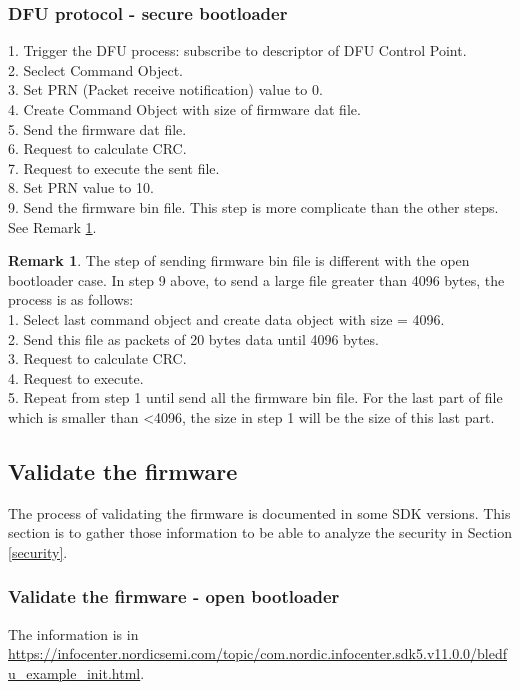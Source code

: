 \documentclass{article}
\theoremstyle{plain}
\theoremstyle{definition}
\newtheorem{remark}{Remark}
\numberwithin{equation}{section}
\begin{document}
\subsubsection{DFU protocol - secure bootloader}\label{protocol dfu secure}


1. Trigger the DFU process: subscribe to descriptor of DFU Control Point.\\
2. Seclect Command Object.\\
3. Set PRN (Packet receive notification) value to 0.\\
4. Create Command Object with size of firmware dat file.\\
5. Send the firmware dat file.\\
6. Request to calculate CRC.\\
7. Request to execute the sent file.\\
8. Set PRN value to 10.\\
9. Send the firmware bin file. This step is more complicate than the other steps. See Remark \ref{send file}.


\begin{remark}\label{send file} The step of sending firmware bin file is different with the open bootloader case.
	In step 9 above, to send a large file greater than 4096 bytes, the process is as follows:\\
	1. Select last command object and create data object with size = 4096.\\
	2. Send this file as packets of 20 bytes data until 4096 bytes.\\
	3. Request to calculate CRC.\\
	4. Request to execute.\\
	5. Repeat from step 1 until send all the firmware bin file. For the last part of file which is smaller than <4096, the size in step 1 will be the size of this last part.
\end{remark}

\subsection{Validate the firmware}\label{validate}
The process of validating the firmware is documented in some SDK versions. This section is to gather those information to be able to analyze the security in Section \ref{security}.



\subsubsection{Validate the firmware - open bootloader}\label{sec check open}
The information is in  \url{https://infocenter.nordicsemi.com/topic/com.nordic.infocenter.sdk5.v11.0.0/bledfu_example_init.html}.
\end{document}
